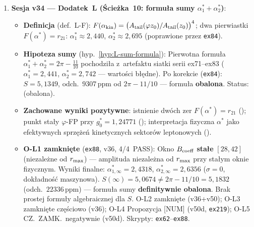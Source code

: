 \begin{remark}
\begin{enumerate}[nosep]
  \item \textbf{Sesja v34 --- Dodatek~L (\'{S}cie\.zka~10: formu\l{}a sumy $\alpha_1^*+\alpha_2^*$)}:
    \begin{itemize}[nosep]
      \item \textbf{Definicja} (def.~L-F):
        $F(\alpha_{\rm kin}) = \bigl(A_{\rm tail}(\varphi z_0) / A_{\rm tail}(z_0)\bigr)^4$;
        dwa pierwiastki $F(\alpha^*) = r_{21}$:
        $\alpha_1^* \approx 2{,}440$, $\alpha_2^* \approx 2{,}695$
        (poprawione przez \texttt{ex84}).
      \item \textbf{Hipoteza sumy} (hyp.~\ref{hyp:L-sum-formula}):
        Pierwotna formu\l{}a $\alpha_1^* + \alpha_2^* = 2\pi - \tfrac{11}{10}$
        pochodzi\l{}a z~artefaktu siatki serii ex71--ex83
        ($\alpha_1^*=2{,}441$, $\alpha_2^*=2{,}742$ --- warto\'sci b\l{}\k{e}dne).
        Po korekcie (\texttt{ex84}): $S = 5{,}1349$, odch.\ $9307\,\text{ppm}$
        od $2\pi{-}11/10$ --- formu\l{}a \textbf{obalona}.
        Status:  (obalona).
      \item \textbf{Zachowane wyniki pozytywne}:
        istnienie dw\'och zer $F(\alpha^*)=r_{21}$ ();
        punkt sta\l{}y $\varphi$-FP przy $g_0^* = 1{,}24771$
        ();
        interpretacja fizyczna $\alpha^*$ jako efektywnych sprz\k{e}\.ze\'n
        kinetycznych sektor\'ow leptonowych ().
      \item \textbf{O-L1 zamkni\k{e}te} (\texttt{ex88}, v36, 4/4~PASS):
        Okno $B_{\rm coeff}$ \textbf{sta\l{}e} $[28,42]$ (niezale\.zne od
        $r_{\rm max}$) --- amplituda niezale\.zna od $r_{\rm max}$ przy
        sta\l{}ym oknie fizycznym.
        Wyniki finalne:
        $\alpha^*_{1,\infty} = 2{,}4318$,
        $\alpha^*_{2,\infty} = 2{,}6356$ ($\sigma=0$, dok\l{}adno\'s\'c maszynowa).
        $S(\infty) = 5{,}0674 \neq 2\pi - 11/10 = 5{,}1832$ (odch.\ $22336\,\text{ppm}$)
        --- formu\l{}a sumy \textbf{definitywnie obalona}.
        Brak prostej formu\l{}y algebraicznej dla $S$.
        O-L2 zamkni\k{e}te (v36+v50); O-L3 zamkni\k{e}te cz\k{e}\'sciowo (v36);
        O-L4 Propozycja [NUM] (v50d, \texttt{ex219}); O-L5 CZ.~ZAMK.\ negatywnie (v50d).
        Skrypty: \texttt{ex62}--\texttt{ex88}.
    \end{itemize}


\end{enumerate}
\end{remark}
